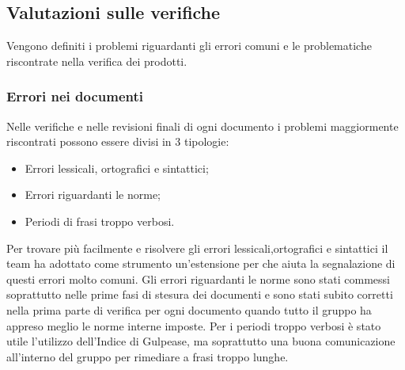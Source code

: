 \documentclass[../piano-di-qualifica.tex]{subfiles}
\begin{document}
\subsection{Valutazioni sulle verifiche}
\label{sub:valutazioni_verifiche}
Vengono definiti i problemi riguardanti gli errori comuni e le problematiche riscontrate nella verifica dei prodotti.

\subsubsection{Errori nei documenti}
\label{sub:errori_documenti}
Nelle verifiche e nelle revisioni finali di ogni documento i problemi maggiormente riscontrati possono essere divisi in 3 tipologie:
\begin{itemize}
    \item Errori lessicali, ortografici e sintattici;
    \item Errori riguardanti le norme;
    \item Periodi di frasi troppo verbosi.
\end{itemize}
Per trovare più facilmente e risolvere gli errori lessicali,ortografici e sintattici il team ha adottato come strumento un'estensione per  che aiuta la segnalazione di questi errori molto comuni.
Gli errori riguardanti le norme sono stati commessi soprattutto nelle prime fasi di stesura dei documenti e sono stati subito corretti nella prima parte di verifica per ogni documento quando tutto il gruppo ha appreso meglio le norme interne imposte.
Per i periodi troppo verbosi è stato utile l'utilizzo dell'Indice di Gulpease, ma soprattutto una buona comunicazione all'interno del gruppo per rimediare a frasi troppo lunghe.
\end{document}

